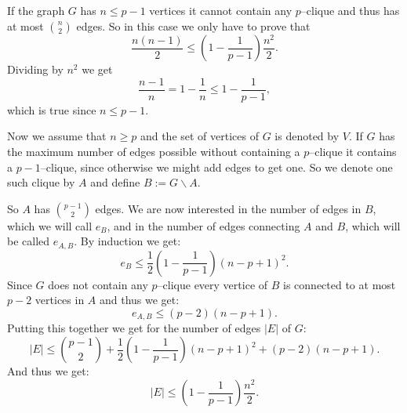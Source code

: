 \documentclass[12pt]{article}
\begin{document}
If the graph $G$ has $n\leq p-1$ vertices it cannot contain any $p$--clique and thus has at most ${n\choose 2}$ edges. So in this case we only have to prove that
$$\frac{n(n-1)}{2}\leq\left( 1-\frac{1}{p-1}\right)\frac{n^2}{2}.$$
Dividing by $n^2$ we get
$$\frac{n-1}{n}=1-\frac{1}{n}\leq 1-\frac{1}{p-1},$$
which is true since $n\leq p-1$.

Now we assume that $n\geq p$ and the set of vertices of $G$ is denoted by $V$. If $G$ has the maximum number of edges possible without containing a $p$--clique it contains a $p-1$--clique, since otherwise we might add edges to get one. So we denote one such clique by $A$ and define $B:=G\backslash A$.

So $A$ has ${p-1\choose 2}$ edges. We are now interested in the number of edges in  $B$, which we will call $e_B$, and in the number of edges connecting $A$ and $B$, which will be called $e_{A,B}$. By induction we get:
$$e_B\leq\frac{1}{2}\left( 1-\frac{1}{p-1}\right)\left(n-p+1\right)^2.$$
Since $G$ does not contain any $p$--clique every vertice of $B$ is connected to at most $p-2$ vertices in $A$ and thus we get:
$$e_{A,B}\leq (p-2)(n-p+1).$$
Putting this together we get for the number of edges $|E|$ of $G$:
$$|E|\leq{p-1\choose 2}+\frac{1}{2}\left(1-\frac{1}{p-1}\right)(n-p+1)^2+(p-2)(n -p+1).$$
And thus we get:
$$|E|\leq\left( 1-\frac{1}{p-1}\right)\frac{n^2}{2}.$$
\end{document}
